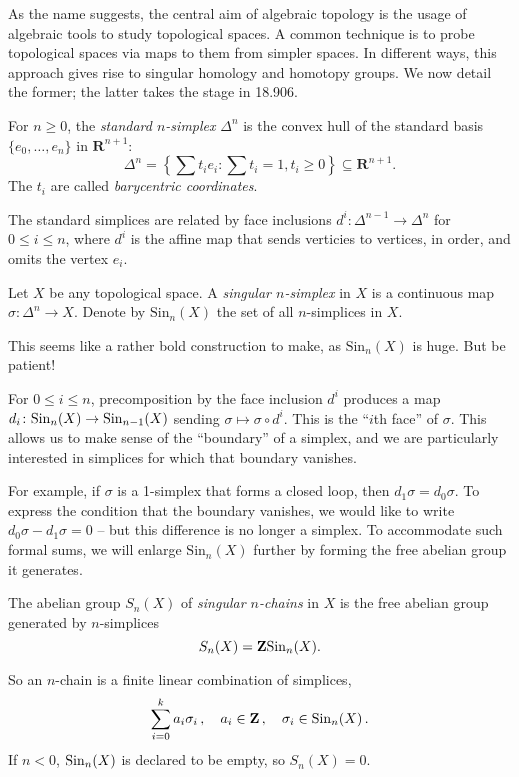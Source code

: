 As the name suggests, the central aim of algebraic topology is the usage of algebraic tools to study topological spaces. A common technique is to probe topological spaces via maps to them from simpler spaces. In different ways, this approach gives rise to singular homology and homotopy groups. We now detail the former; the latter takes the stage in 18.906.
\begin{definition}
For $n\geq 0$, the \emph{standard $n$-simplex} $\Delta^n$ is the convex hull of the standard basis $\{e_0,\ldots,e_n\}$ in $\mathbf{R}^{n+1}$:
$$\Delta^n = \left\{\sum t_i e_i : \sum t_i = 1, t_i\geq 0\right\}\subseteq\mathbf{R}^{n+1}.$$
The $t_i$ are called {\em barycentric coordinates}.
\end{definition}
The standard simplices are related by face inclusions $d^i\colon \Delta^{n-1} \to \Delta^{n}$ for $0\leq i \leq n$, where $d^i$ is the affine map that sends
verticies to vertices, in order, and omits the vertex $e_i$.


\begin{definition}
Let $X$ be any topological space. A \emph{singular $n$-simplex} in $X$ is a continuous map $\sigma:\Delta^n\to X$. Denote by $\mathrm{Sin}_n(X)$ the set of all $n$-simplices in $X$.
\end{definition}
    
This seems like a rather bold construction to make, as $\mathrm{Sin}_n(X)$ is huge. But be patient! 

For $0\leq i \leq n$, precomposition by the face inclusion $d^i$ produces a map $d_i\colon \mathrm{Sin}_n(X)\to\mathrm{Sin}_{n-1}(X)$ sending $\sigma\mapsto\sigma\circ d^i$. This is the ``$i$th face'' of $\sigma$. This allows us to make sense of the ``boundary'' of a simplex, and we are particularly interested in simplices for which that boundary vanishes.

For example, if $\sigma$ is a 1-simplex that forms a closed loop,
then $d_1\sigma = d_0\sigma$. To express the condition that the boundary vanishes, we would like to write $d_0\sigma - d_1\sigma=0$ -- but this difference is no longer a simplex. To accommodate such formal sums, we will enlarge $\mathrm{Sin}_n(X)$ further by forming the free abelian group it generates.
\begin{definition}
The abelian group $S_n(X)$ of \emph{singular $n$-chains} in $X$ is the free abelian group generated by $n$-simplices
$$S_n(X) = \mathbf{Z}\mathrm{Sin}_n(X).$$
\end{definition}
So an $n$-chain is a finite linear combination of simplices,
\[
\sum_{i=0}^ka_i\sigma_i\,,\quad a_i\in\mathbf{Z}\,,\quad\sigma_i\in\mathrm{Sin}_n(X)\,.
\]
If $n<0$, $\mathrm{Sin}_n(X)$ is declared to be empty, so $S_n(X)=0$. 

